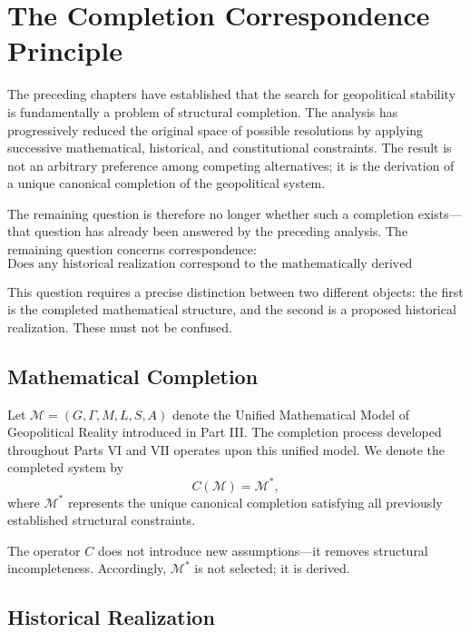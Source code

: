 \documentclass[11pt,openany]{book}
\theoremstyle{plain}
\theoremstyle{definition}
\begin{document}
\section{The Completion Correspondence Principle}

The preceding chapters have established that the search for geopolitical stability is fundamentally a problem of structural completion. The analysis has progressively reduced the original space of possible resolutions by applying successive mathematical, historical, and constitutional constraints. The result is not an arbitrary preference among competing alternatives; it is the derivation of a unique canonical completion of the geopolitical system.

The remaining question is therefore no longer whether such a completion exists—that question has already been answered by the preceding analysis. The remaining question concerns correspondence:
\[
\boxed{
\text{Does any historical realization correspond to the mathematically derived completion?}
}
\]

This question requires a precise distinction between two different objects: the first is the completed mathematical structure, and the second is a proposed historical realization. These must not be confused.

\subsection*{Mathematical Completion}

Let \(\mathcal{M} = (G,\Gamma,M,L,S,A)\) denote the Unified Mathematical Model of Geopolitical Reality introduced in Part III. The completion process developed throughout Parts VI and VII operates upon this unified model. We denote the completed system by
\[
\boxed{
C(\mathcal{M}) = \mathcal{M}^{*},
}
\]
where \(\mathcal{M}^{*}\) represents the unique canonical completion satisfying all previously established structural constraints. 

The operator \(C\) does not introduce new assumptions—it removes structural incompleteness. Accordingly, \(\mathcal{M}^{*}\) is not selected; it is derived.

\subsection*{Historical Realization}
\end{document}
